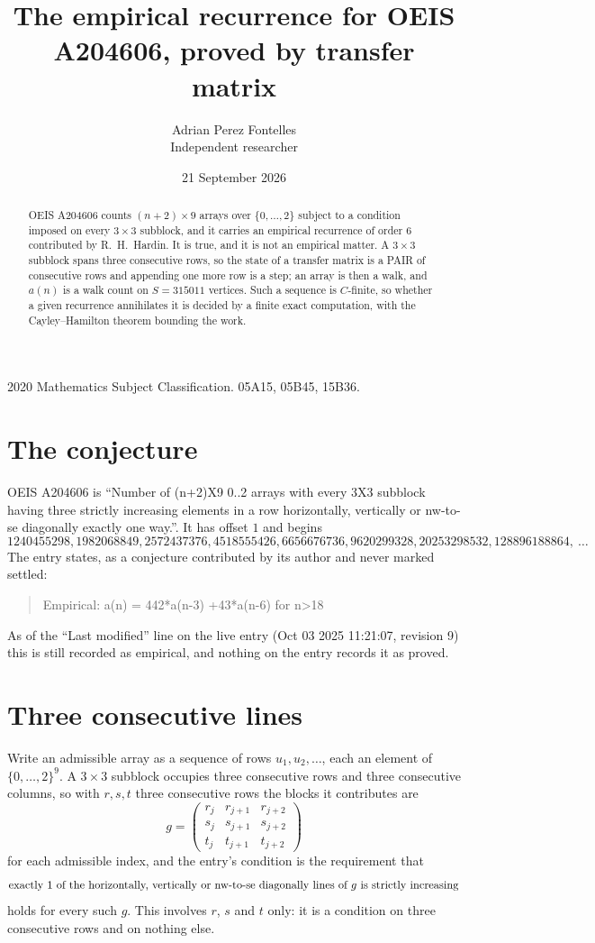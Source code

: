 \documentclass[11pt,a4paper]{article}
\title{The empirical recurrence for OEIS A204606, proved by transfer matrix}
\author{Adrian Perez Fontelles\\ \small Independent researcher}
\date{21 September 2026}
\theoremstyle{plain}
\theoremstyle{definition}
\begin{document}
\maketitle

\begin{abstract}
OEIS A204606 counts $(n+2)\times9$ arrays over $\{0,\dots,2\}$ subject to a condition imposed on
every $3\times3$ subblock, and it carries an empirical recurrence of order $6$
contributed by R.~H.~Hardin. It is true, and it is not an empirical matter. A $3\times3$
subblock spans three consecutive rows, so the state of a transfer matrix is a PAIR of
consecutive rows and appending one more row is a step; an array is then a walk, and
$a(n)$ is a walk count on $S=315011$ vertices. Such a sequence is $C$-finite, so whether a given
recurrence annihilates it is decided by a finite exact computation, with the Cayley--Hamilton
theorem bounding the work.
\end{abstract}

\noindent\small 2020 Mathematics Subject Classification. 05A15, 05B45, 15B36.\normalsize

\section{The conjecture}

OEIS A204606 is ``Number of (n+2)X9 0..2 arrays with every 3X3 subblock having three strictly increasing elements in a row horizontally, vertically or nw-to-se diagonally exactly one way.''. It has offset $1$ and begins
\[
1240455298, 1982068849, 2572437376, 4518555426, 6656676736, 9620299328, 20253298532, 128896188864,\ \dots
\]
The entry states, as a conjecture contributed by its author and never marked settled:
\begin{quote}
Empirical: a(n) = 442*a(n-3) +43*a(n-6) for n>18
\end{quote}
As of the ``Last modified'' line on the live entry (Oct 03 2025 11:21:07, revision 9) this is still
recorded as empirical, and nothing on the entry records it as proved.

\section{Three consecutive lines}

Write an admissible array as a sequence of rows $u_1,u_2,\dots$, each an element of
$\{0,\dots,2\}^{9}$. A $3\times3$ subblock occupies three consecutive rows and
three consecutive columns, so with $r,s,t$ three consecutive rows the blocks it
contributes are
\[
g=\begin{pmatrix}r_j&r_{j+1}&r_{j+2}\\ s_j&s_{j+1}&s_{j+2}\\ t_j&t_{j+1}&t_{j+2}\end{pmatrix}
\]
for each admissible index, and the entry's condition is the requirement that
\[
\text{exactly }1\text{ of the horizontally, vertically or nw-to-se diagonally lines of }g\text{ \text{is strictly increasing}}
\]
holds for every such $g$. This involves $r$, $s$ and $t$ only: it is a condition on
three consecutive rows and on nothing else.
\end{document}
